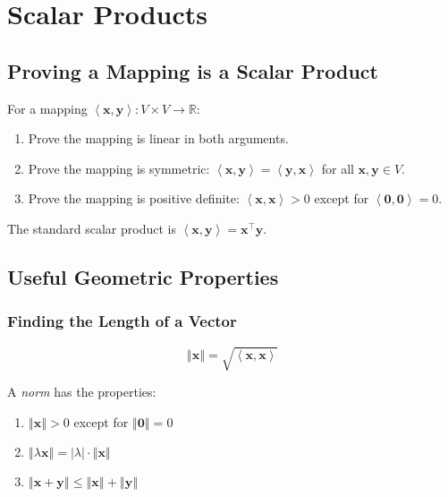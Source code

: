 \documentclass[10pt,twoside,twocolumn]{article}
\newcommand{\R}[0]{\mathds{R}} %
\begin{document}
\section{Scalar Products}


\subsection{Proving a Mapping is a Scalar Product}

For a mapping $\left\langle \mathbf{x},\mathbf{y}\right\rangle :V\times V\rightarrow\R$: 
\begin{enumerate}
\item Prove the mapping is linear in both arguments. 
\item Prove the mapping is symmetric: $\left\langle \mathbf{x},\mathbf{y}\right\rangle =\left\langle \mathbf{y},\mathbf{x}\right\rangle $
for all $\mathbf{x},\mathbf{y}\in V$. 
\item Prove the mapping is positive definite: $\left\langle \mathbf{x},\mathbf{x}\right\rangle >0$
except for $\left\langle \mathbf{0},\mathbf{0}\right\rangle =0$. 
\end{enumerate}
The standard scalar product is $\left\langle \mathbf{x},\mathbf{y}\right\rangle =\mathbf{x}^{\top}\mathbf{y}$.


\subsection{Useful Geometric Properties}


\subsubsection{Finding the Length of a Vector}

\[
\left\Vert \mathbf{x}\right\Vert =\sqrt{\left\langle \mathbf{x},\mathbf{x}\right\rangle }
\]


A \emph{norm} has the properties: 
\begin{enumerate}
\item $\left\Vert \mathbf{x}\right\Vert >0$ except for $\left\Vert \mathbf{0}\right\Vert =0$ 
\item $\left\Vert \lambda\mathbf{x}\right\Vert =\left|\lambda\right|\cdot\left\Vert \mathbf{x}\right\Vert $ 
\item $\left\Vert \mathbf{x}+\mathbf{y}\right\Vert \leq\left\Vert \mathbf{x}\right\Vert +\left\Vert \mathbf{y}\right\Vert $ 
\end{enumerate}
\end{document}
